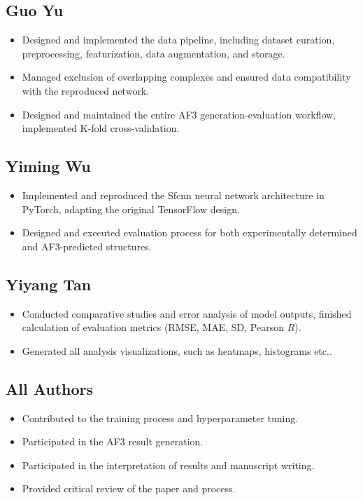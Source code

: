 \documentclass[unnumsec,webpdf,contemporary,large]{oup-authoring-template}
\theoremstyle{thmstyleone}%
\theoremstyle{thmstyletwo}%
\theoremstyle{thmstylethree}%
\begin{document}
\subsection{Guo Yu}
\begin{itemize}
    \item Designed and implemented the data pipeline, including dataset curation, preprocessing, featurization, data augmentation, and storage.
    \item Managed exclusion of overlapping complexes and ensured data compatibility with the reproduced network.
    \item Designed and maintained the entire AF3 generation-evaluation workflow, implemented K-fold cross-validation.
\end{itemize}

\subsection{Yiming Wu}
\begin{itemize}
    \item Implemented and reproduced the Sfcnn neural network architecture in PyTorch, adapting the original TensorFlow design.
    \item Designed and executed evaluation process for both experimentally determined and AF3-predicted structures.
\end{itemize}

\subsection{Yiyang Tan}
\begin{itemize}
    \item Conducted comparative studies and error analysis of model outputs, finished calculation of evaluation metrics (RMSE, MAE, SD, Pearson $R$).
    \item Generated all analysis visualizations, such as heatmaps, histograms etc..
\end{itemize}

\subsection{All Authors}
\begin{itemize}
    \item Contributed to the training process and hyperparameter tuning.
    \item Participated in the AF3 result generation.
    \item Participated in the interpretation of results and manuscript writing.
    \item Provided critical review of the paper and process.
\end{itemize}  
\end{document}
